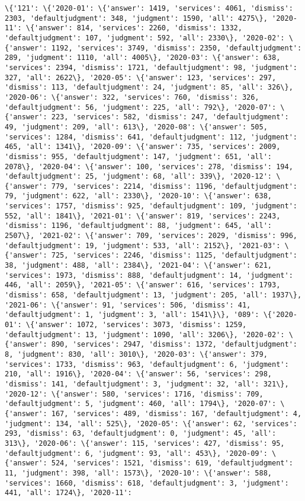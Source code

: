 \documentclass[11pt]{article}
\begin{document}
\begin{Verbatim}[commandchars=\\\{\}]
\{'121': \{'2020-01': \{'answer': 1419, 'services': 4061, 'dismiss': 2303, 'defaultjudgment': 348, 'judgment': 1590, 'all': 4275\}, '2020-11': \{'answer': 814, 'services': 2260, 'dismiss': 1332, 'defaultjudgment': 107, 'judgment': 592, 'all': 2330\}, '2020-02': \{'answer': 1192, 'services': 3749, 'dismiss': 2350, 'defaultjudgment': 289, 'judgment': 1110, 'all': 4005\}, '2020-03': \{'answer': 638, 'services': 2394, 'dismiss': 1721, 'defaultjudgment': 98, 'judgment': 327, 'all': 2622\}, '2020-05': \{'answer': 123, 'services': 297, 'dismiss': 113, 'defaultjudgment': 24, 'judgment': 85, 'all': 326\}, '2020-06': \{'answer': 322, 'services': 760, 'dismiss': 326, 'defaultjudgment': 56, 'judgment': 225, 'all': 792\}, '2020-07': \{'answer': 223, 'services': 582, 'dismiss': 247, 'defaultjudgment': 49, 'judgment': 209, 'all': 613\}, '2020-08': \{'answer': 505, 'services': 1284, 'dismiss': 641, 'defaultjudgment': 112, 'judgment': 465, 'all': 1341\}, '2020-09': \{'answer': 735, 'services': 2009, 'dismiss': 955, 'defaultjudgment': 147, 'judgment': 651, 'all': 2078\}, '2020-04': \{'answer': 100, 'services': 278, 'dismiss': 194, 'defaultjudgment': 25, 'judgment': 68, 'all': 339\}, '2020-12': \{'answer': 779, 'services': 2214, 'dismiss': 1196, 'defaultjudgment': 79, 'judgment': 622, 'all': 2330\}, '2020-10': \{'answer': 638, 'services': 1757, 'dismiss': 925, 'defaultjudgment': 109, 'judgment': 552, 'all': 1841\}, '2021-01': \{'answer': 819, 'services': 2243, 'dismiss': 1196, 'defaultjudgment': 88, 'judgment': 645, 'all': 2507\}, '2021-02': \{'answer': 709, 'services': 2029, 'dismiss': 996, 'defaultjudgment': 19, 'judgment': 533, 'all': 2152\}, '2021-03': \{'answer': 725, 'services': 2246, 'dismiss': 1125, 'defaultjudgment': 38, 'judgment': 488, 'all': 2384\}, '2021-04': \{'answer': 621, 'services': 1973, 'dismiss': 888, 'defaultjudgment': 14, 'judgment': 446, 'all': 2059\}, '2021-05': \{'answer': 616, 'services': 1793, 'dismiss': 658, 'defaultjudgment': 13, 'judgment': 205, 'all': 1937\}, '2021-06': \{'answer': 91, 'services': 506, 'dismiss': 41, 'defaultjudgment': 1, 'judgment': 3, 'all': 1541\}\}, '089': \{'2020-01': \{'answer': 1072, 'services': 3073, 'dismiss': 1259, 'defaultjudgment': 13, 'judgment': 1090, 'all': 3206\}, '2020-02': \{'answer': 890, 'services': 2947, 'dismiss': 1372, 'defaultjudgment': 8, 'judgment': 830, 'all': 3010\}, '2020-03': \{'answer': 379, 'services': 1733, 'dismiss': 963, 'defaultjudgment': 6, 'judgment': 210, 'all': 1916\}, '2020-04': \{'answer': 56, 'services': 298, 'dismiss': 141, 'defaultjudgment': 3, 'judgment': 32, 'all': 321\}, '2020-12': \{'answer': 580, 'services': 1716, 'dismiss': 709, 'defaultjudgment': 5, 'judgment': 460, 'all': 1794\}, '2020-07': \{'answer': 167, 'services': 489, 'dismiss': 167, 'defaultjudgment': 4, 'judgment': 134, 'all': 525\}, '2020-05': \{'answer': 62, 'services': 293, 'dismiss': 63, 'defaultjudgment': 0, 'judgment': 45, 'all': 313\}, '2020-06': \{'answer': 115, 'services': 427, 'dismiss': 95, 'defaultjudgment': 6, 'judgment': 93, 'all': 453\}, '2020-09': \{'answer': 524, 'services': 1521, 'dismiss': 619, 'defaultjudgment': 11, 'judgment': 398, 'all': 1573\}, '2020-10': \{'answer': 588, 'services': 1660, 'dismiss': 618, 'defaultjudgment': 3, 'judgment': 441, 'all': 1724\}, '2020-11': 
\end{Verbatim}
\end{document}
